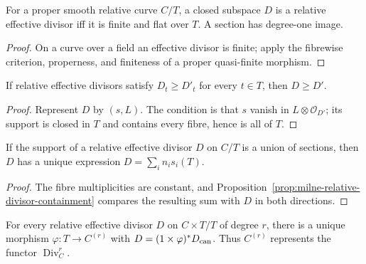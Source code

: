 \begin{corollary}\label{cor:milne-relative-divisor-finite-flat}
For a proper smooth relative curve $C/T$, a closed subspace $D$ is a relative effective divisor iff it is finite and flat over $T$. A section has degree-one image.
\end{corollary}

\begin{proof}
On a curve over a field an effective divisor is finite; apply the fibrewise criterion, properness, and finiteness of a proper quasi-finite morphism.
\end{proof}

\begin{proposition}\label{prop:milne-relative-divisor-containment}
If relative effective divisors satisfy $D_t\ge D'_t$ for every $t\in T$, then $D\ge D'$.
\end{proposition}

\begin{proof}
Represent $D$ by $(s,L)$. The condition is that $s$ vanish in $L\otimes\mathcal O_{D'}$; its support is closed in $T$ and contains every fibre, hence is all of $T$.
\end{proof}

\begin{proposition}\label{prop:milne-split-relative-divisor}
If the support of a relative effective divisor $D$ on $C/T$ is a union of sections, then $D$ has a unique expression $D=\sum_i n_i s_i(T)$.
\end{proposition}

\begin{proof}
The fibre multiplicities are constant, and Proposition~\ref{prop:milne-relative-divisor-containment} compares the resulting sum with $D$ in both directions.
\end{proof}

\begin{theorem}\label{thm:milne-effective-divisor-representability}
For every relative effective divisor $D$ on $C\times T/T$ of degree $r$, there is a unique morphism $\varphi:T\to C^{(r)}$ with $D=(1\times\varphi)^*D_{\rm can}$. Thus $C^{(r)}$ represents the functor $\operatorname{Div}_C^r$.
\end{theorem}

